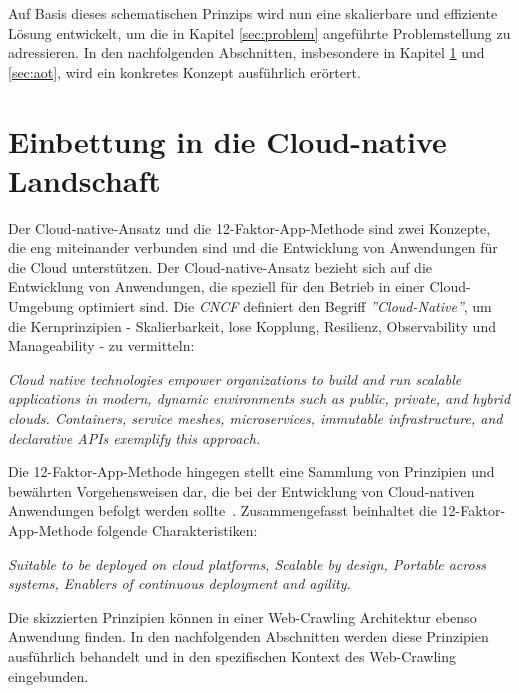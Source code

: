 Auf Basis dieses schematischen Prinzips wird nun eine skalierbare und effiziente Lösung entwickelt, um die in Kapitel \ref{sec:problem} angeführte Problemstellung zu adressieren. In den nachfolgenden Abschnitten, insbesondere in Kapitel \ref{sec:cloudnative} und \ref{sec:aot}, wird ein konkretes Konzept ausführlich erörtert.
\section{Einbettung in die Cloud-native Landschaft} \label{sec:cloudnative}
Der Cloud-native-Ansatz und die 12-Faktor-App-Methode sind zwei Konzepte, die eng miteinander verbunden sind und die Entwicklung von Anwendungen für die Cloud unterstützen. Der Cloud-native-Ansatz bezieht sich auf die Entwicklung von Anwendungen, die speziell für den Betrieb in einer Cloud-Umgebung optimiert sind. 
Die \textit{\ac{CNCF}} definiert den Begriff \textit{''Cloud-Native''}, um die Kernprinzipien - Skalierbarkeit, lose Kopplung, Resilienz, Observability und Manageability - zu vermitteln:

\begin{spar}
\textit{Cloud native technologies empower organizations to build and run scalable applications in modern, dynamic environments such as public, private, and hybrid clouds. Containers, service meshes, microservices, immutable infrastructure, and declarative APIs exemplify this approach.~\parencite[][]{CNCF}}
\end{spar}


Die 12-Faktor-App-Methode hingegen stellt eine Sammlung von Prinzipien und bewährten Vorgehensweisen dar, die bei der Entwicklung von Cloud-nativen Anwendungen befolgt werden sollte~\parencite[vgl.][]{12Factor}.
Zusammengefasst beinhaltet die 12-Faktor-App-Methode folgende Charakteristiken: 

\begin{spar}
\textit{Suitable to be deployed on cloud platforms, Scalable by design, Portable across systems, Enablers of continuous deployment and agility.~\parencite[][S. 36]{vitale}}
\end{spar}

Die skizzierten Prinzipien können in einer Web-Crawling Architektur ebenso Anwendung finden. In den nachfolgenden Abschnitten werden diese Prinzipien ausführlich behandelt und in den spezifischen Kontext des Web-Crawling eingebunden.


